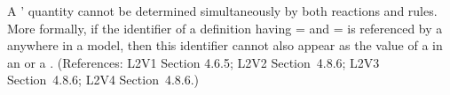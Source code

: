 A \Species' quantity cannot be determined simultaneously by both
reactions and rules.  More formally, if the identifier of a
\Species definition having =
and = is referenced by a
\SpeciesReference anywhere in a model, then this identifier cannot
also appear as the value of a  in an
\AssignmentRule or a \RateRule.  (References: L2V1 Section 4.6.5;
L2V2 Section~4.8.6; L2V3 Section~4.8.6; L2V4 Section~4.8.6.)
